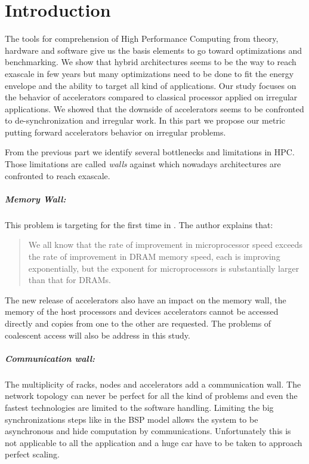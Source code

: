 
\chapter*{Introduction}

The tools for comprehension of High Performance Computing from theory, hardware and software give us the basis elements to go toward optimizations and benchmarking. 
We show that hybrid architectures seems to be the way to reach exascale in few years but many optimizations need to be done to fit the energy envelope and the ability to target all kind of applications. 
Our study focuses on the behavior of accelerators compared to classical processor applied on irregular applications. 
We showed that the downside of accelerators seems to be confronted to de-synchronization and irregular work. 
In this part we propose our metric putting forward accelerators behavior on irregular problems. 

From the previous part we identify several bottlenecks and limitations in HPC. 
Those limitations are called \textit{walls} against which nowadays architectures are confronted to reach exascale. 

\paragraph{Memory Wall: }
This problem is targeting for the first time in \cite{wulf1995hitting}.
The author explains that:
\begin{quotation} We all know that the rate of improvement in microprocessor speed exceeds the rate of improvement in DRAM memory speed, each is improving exponentially, but the exponent for microprocessors is substantially larger than that for DRAMs.
\end{quotation}
The new release of accelerators also have an impact on the memory wall, the memory of the host processors and devices accelerators cannot be accessed directly and copies from one to the other are requested.
The problems of coalescent access will also be address in this study.

\paragraph{Communication wall: } 
The multiplicity of racks, nodes and accelerators add a communication wall. 
The network topology can never be perfect for all the kind of problems and even the fastest technologies are limited to the software handling. 
Limiting the big synchronizations steps like in the BSP model allows the system to be asynchronous and hide computation by communications. 
Unfortunately this is not applicable to all the application and a huge car have to be taken to approach perfect scaling. 

